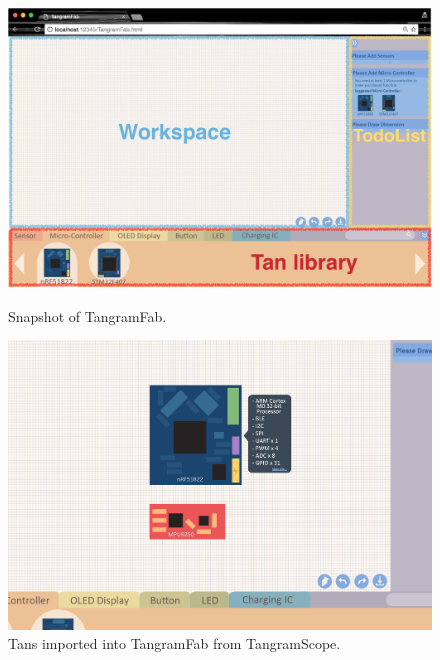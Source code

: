 \begin{figure}[!h]
\begin{minipage}[t]{1\columnwidth}
  \centering
  \includegraphics[width=1\textwidth]{image/tan/TangramFab-Comment}
  \caption{Snapshot of TangramFab.}\label{fig:tangramFab-comment}
\end{minipage} 
\begin{minipage}[t]{0.47\columnwidth}
    \centering
    \includegraphics[width=1\textwidth]{image/tan/TangramFab-Initial}
    \caption{Tans imported into TangramFab from TangramScope.}\label{fig:tangramFab-initial}
\end{minipage}
\hspace{0.1cm}
\begin{minipage}[t]{0.47\columnwidth} 
    \centering

\end{minipage}
\end{figure}
